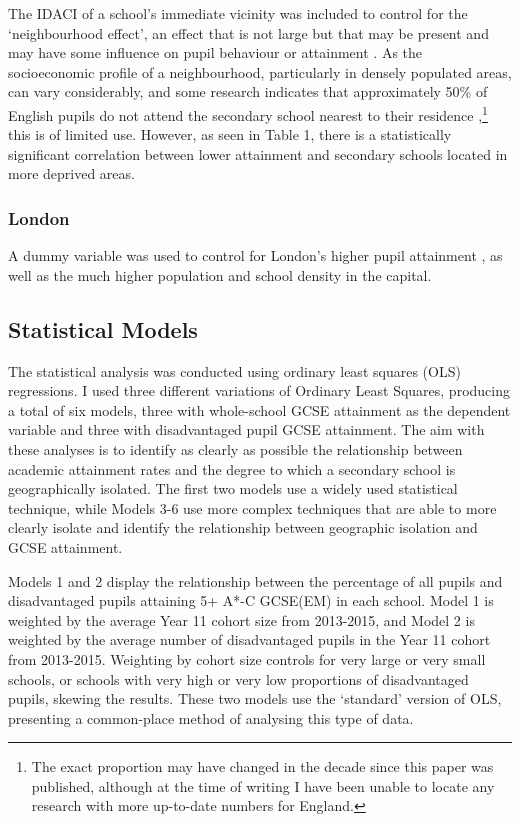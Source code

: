 \documentclass[12pt, a4paper]{article}
\begin{document}
The IDACI of a school's immediate vicinity was included to control for the `neighbourhood effect', an effect that is not large but that may be present and may have some influence on pupil behaviour or attainment \autocites{broadhurst2008, gibbons2010, gibbons2013, mcculloch2001, mcculloch2006}. As the socioeconomic profile of a neighbourhood, particularly in densely populated areas, can vary considerably, and some research indicates that approximately 50\% of English pupils do not attend the secondary school nearest to their residence \autocites{allen2007},\footnote{The exact proportion may have changed in the decade since this paper was published, although at the time of writing I have been unable to locate any research with more up-to-date numbers for England.} this is of limited use. However, as seen in Table 1, there is a statistically significant correlation between lower attainment and secondary schools located in more deprived areas.

\subsubsection{London}

A dummy variable was used to control for London's higher pupil attainment \autocites{baars2014, blanden2015}, as well as the much higher population and school density in the capital.

\subsection{Statistical Models}

The statistical analysis was conducted using ordinary least squares (OLS) regressions. I used three different variations of Ordinary Least Squares, producing a total of six models, three with whole-school GCSE attainment as the dependent variable and three with disadvantaged pupil GCSE attainment. The aim with these analyses is to identify as clearly as possible the relationship between academic attainment rates and the degree to which a secondary school is geographically isolated. The first two models use a widely used statistical technique, while Models 3-6 use more complex techniques that are able to more clearly isolate and identify the relationship between geographic isolation and GCSE attainment.

Models 1 and 2 display the relationship between the percentage of all pupils and disadvantaged pupils attaining 5+ A*-C GCSE(EM) in each school. Model 1 is weighted by the average Year 11 cohort size from 2013-2015, and Model 2 is weighted by the average number of disadvantaged pupils in the Year 11 cohort from 2013-2015. Weighting by cohort size controls for very large or very small schools, or schools with very high or very low proportions of disadvantaged pupils, skewing the results. These two models use the `standard' version of OLS, presenting a common-place method of analysing this type of data.
\end{document}
